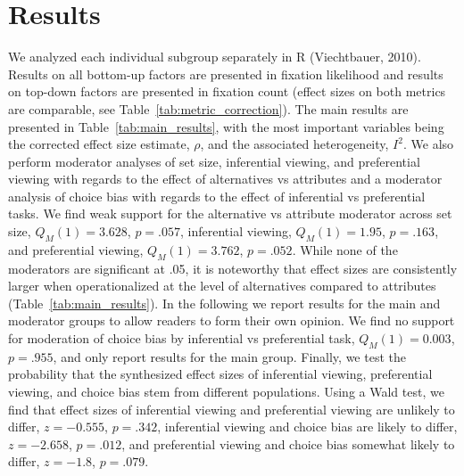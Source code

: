 \documentclass{article}
\begin{document}

\section{Results}


We analyzed each individual subgroup separately in R (Viechtbauer, 2010). Results on all bottom-up factors are presented in fixation likelihood and results on top-down factors are presented in fixation count (effect sizes on both metrics are comparable, see Table~\ref{tab:metric_correction}). The main results are presented in Table~\ref{tab:main_results}, with the most important variables being the corrected effect size estimate, $\rho$, and the associated heterogeneity, $I^2$. We also perform moderator analyses of set size, inferential viewing, and preferential viewing with regards to the effect of alternatives vs attributes and a moderator analysis of choice bias with regards to the effect of inferential vs preferential tasks. We find weak support for the alternative vs attribute moderator across set size, $Q_M(1) = 3.628$, $p = .057$, inferential viewing, $Q_M (1) = 1.95$, $p = .163$, and preferential viewing, $Q_M (1) = 3.762$, $p = .052$. While none of the moderators are significant at .05, it is noteworthy that effect sizes are consistently larger when operationalized at the level of alternatives compared to attributes (Table~\ref{tab:main_results}). In the following we report results for the main and moderator groups to allow readers to form their own opinion. We find no support for moderation of choice bias by inferential vs preferential task, $Q_M(1) = 0.003$, $p = .955$, and only report results for the main group. Finally, we test the probability that the synthesized effect sizes of inferential viewing, preferential viewing, and choice bias stem from different populations. Using a Wald test, we find that effect sizes of inferential viewing and preferential viewing are unlikely to differ, $z = -0.555$, $p = .342$, inferential viewing and choice bias are likely to differ, $z = -2.658$, $p = .012$, and preferential viewing and choice bias somewhat likely to differ, $z = -1.8$, $p = .079$.
\end{document}
